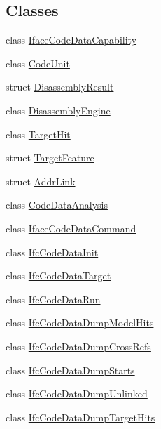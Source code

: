 \subsection*{Classes}
\begin{DoxyCompactItemize}
\item 
class \mbox{\hyperlink{class_iface_code_data_capability}{Iface\+Code\+Data\+Capability}}
\item 
class \mbox{\hyperlink{class_code_unit}{Code\+Unit}}
\item 
struct \mbox{\hyperlink{struct_disassembly_result}{Disassembly\+Result}}
\item 
class \mbox{\hyperlink{class_disassembly_engine}{Disassembly\+Engine}}
\item 
class \mbox{\hyperlink{class_target_hit}{Target\+Hit}}
\item 
struct \mbox{\hyperlink{struct_target_feature}{Target\+Feature}}
\item 
struct \mbox{\hyperlink{struct_addr_link}{Addr\+Link}}
\item 
class \mbox{\hyperlink{class_code_data_analysis}{Code\+Data\+Analysis}}
\item 
class \mbox{\hyperlink{class_iface_code_data_command}{Iface\+Code\+Data\+Command}}
\item 
class \mbox{\hyperlink{class_ifc_code_data_init}{Ifc\+Code\+Data\+Init}}
\item 
class \mbox{\hyperlink{class_ifc_code_data_target}{Ifc\+Code\+Data\+Target}}
\item 
class \mbox{\hyperlink{class_ifc_code_data_run}{Ifc\+Code\+Data\+Run}}
\item 
class \mbox{\hyperlink{class_ifc_code_data_dump_model_hits}{Ifc\+Code\+Data\+Dump\+Model\+Hits}}
\item 
class \mbox{\hyperlink{class_ifc_code_data_dump_cross_refs}{Ifc\+Code\+Data\+Dump\+Cross\+Refs}}
\item 
class \mbox{\hyperlink{class_ifc_code_data_dump_starts}{Ifc\+Code\+Data\+Dump\+Starts}}
\item 
class \mbox{\hyperlink{class_ifc_code_data_dump_unlinked}{Ifc\+Code\+Data\+Dump\+Unlinked}}
\item 
class \mbox{\hyperlink{class_ifc_code_data_dump_target_hits}{Ifc\+Code\+Data\+Dump\+Target\+Hits}}
\end{DoxyCompactItemize}
